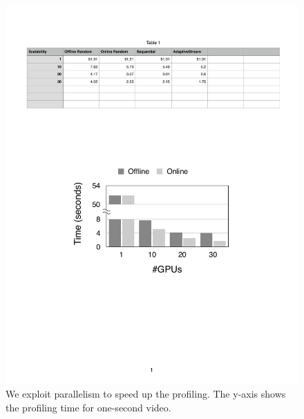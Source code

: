 \begin{figure}
  \centering
  \includegraphics[width=0.9\columnwidth]{figures/parallel.pdf}
  \caption{We exploit parallelism to speed up the profiling. The y-axis shows
    the profiling time for one-second video.}
  \label{fig:parallel}
\end{figure}

